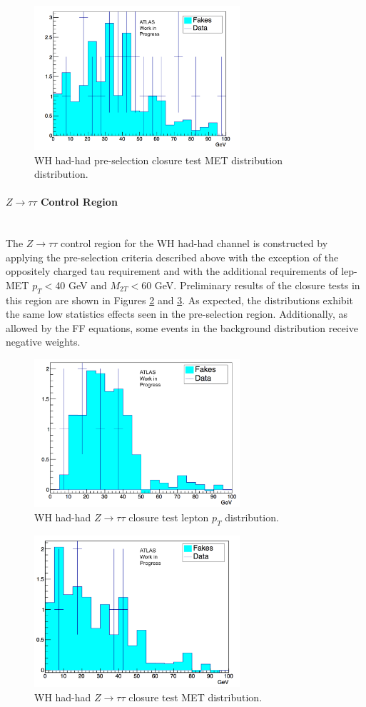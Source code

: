 \pagebreak

\begin{figure}[htb!]
    \centering
    \includegraphics[width=3in]{figures/chapter7/met_whpresel.png}
    \caption{WH had-had pre-selection closure test MET distribution distribution.}
    \label{fig:presel_met}
\end{figure}

\paragraph{$Z\rightarrow\tau\tau$ Control Region}\mbox{} \\

The $Z\rightarrow\tau\tau$ control region for the WH had-had channel is constructed by applying the pre-selection criteria described above with the exception of the oppositely charged tau requirement and with the additional requirements of lep-MET $p_T<$40 GeV and $M_{2T}<60$ GeV. Preliminary results of the closure tests in this region are shown in Figures \ref{fig:leppt_ztautau} and \ref{fig:met_ztautau}. As expected, the distributions exhibit the same low statistics effects seen in the pre-selection region. Additionally, as allowed by the FF equations, some events in the background distribution receive negative weights.

\begin{figure}[htb!]
    \centering
    \includegraphics[width=3in]{figures/chapter7/lep_pt_wh_ztautau.png}
    \caption{WH had-had $Z\rightarrow\tau\tau$ closure test lepton $p_T$ distribution.}
    \label{fig:leppt_ztautau}
\end{figure}

\begin{figure}[htb!]
    \centering
    \includegraphics[width=3in]{figures/chapter7/met_wh_ztautau.png}
    \caption{WH had-had $Z\rightarrow\tau\tau$ closure test MET distribution.}
    \label{fig:met_ztautau}
\end{figure}
